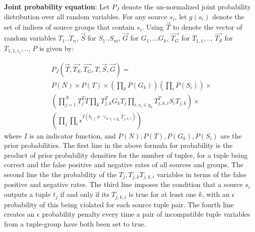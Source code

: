 \documentclass{sig-alternate}
\newcounter{prob}
\newcommand{\stitle}[1]{\vspace{0.5em}\noindent\textbf{#1}}
\begin{document}
\stitle{Joint probability equation}: Let $P_J$ denote the un-normalized joint probability distribution over all random variables. For any source $s_i$, let $g(s_i)$ denote the set of indices of source groups that contain $s_i$. 
Using $\overrightarrow{T}$ to denote the vector of random variables $T_1..T_n$, $\overrightarrow{S}$ for $S_1..S_m$, $\overrightarrow{G}$ for $G_1, ... G_k$,  $\overrightarrow{T_G}$ for $T_{1, 1}, ..$, $\overrightarrow{T_S}$ for $T_{1, 1, i_1}, ..$, $P$ is given by:

\begin{align*}\label{eq:joint-prob} 
& P_J(\overrightarrow{T}, \overrightarrow{T_S}, \overrightarrow{T_G}, T, \overrightarrow{S}, \overrightarrow{G}) =
\\& P(N) \times P(T) \times (\prod_{k} P(G_k)) (\prod_{i} P(S_i)) \times
\\& (\prod_{j=1}^{N} T_{j}^{T}T \prod_{k} T_{j, k}^{T}G_kT_j \prod_{i:s_i\in g_k} T_{j,k,i}^{T}S_iT_{j,k}) \times 
\\& (\prod_{j} \prod_{i} \epsilon^{I(b_{i,j} \neq \lor_{k : s_i \in g_k} T_{j,k,i})})
\end{align*}
where $I$ is an indicator function, and $P(N), P(T), P(G_k), P(S_i)$ are the prior probabilities. The first line in the above formula for probability is the product of prior probability densities for the number of tuples, for a tuple being correct and the false positive and negative rates of all sources and groups. The second line the the probability of the $T_j, T_{j,k} T_{j,k,i}$ variables in terms of the false positive and negative rates. The third line imposes the condition that a source $s_i$ outputs a tuple $t_j$ if and only if its $T_{j,k,i}$ is true for at least one $k$, with an $\epsilon$ probability of this being violated for each source tuple pair. The fourth line creates an $\epsilon$ probability penalty every time a pair of incompatible tuple variables from a tuple-group have both been set to true.
\end{document}
